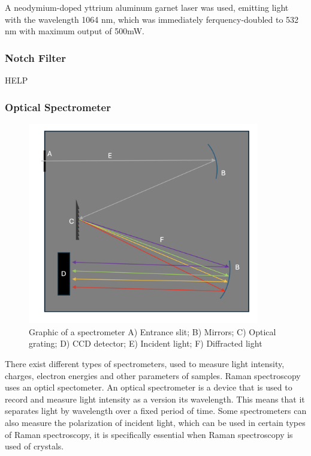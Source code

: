 \bigskip

A neodymium-doped yttrium aluminum garnet laser was used, emitting light with the wavelength 1064 nm, which was immediately ferquency-doubled to 532 nm with maximum output of 500mW.

\subsubsection{Notch Filter}
HELP

\newpage
\subsubsection{Optical Spectrometer}


\begin{figure}[ht]
    \centering
    \includegraphics[width=0.9\textwidth]{images/setup_graphics/spectrometer.png}
    \caption{Graphic of a spectrometer A) Entrance slit; B) Mirrors; C) Optical grating; D) CCD detector; E) Incident light; F) Diffracted light}
    \label{fig:spectrometer}
\end{figure}

There exist different types of spectrometers, used to measure light intensity, charges, electron energies and other parameters of samples. Raman spectroscopy uses an opticl spectometer. An optical spectrometer is a device that is used to record and measure light intensity as a version its wavelength. This means that it separates light by wavelength over a fixed period of time. Some spectrometers can also measure the polarization of incident light, which can be used in certain types of Raman spectroscopy, it is specifically essential when Raman spectroscopy is used of crystals. \cite{RSAA} \cite{wikioptspec}

